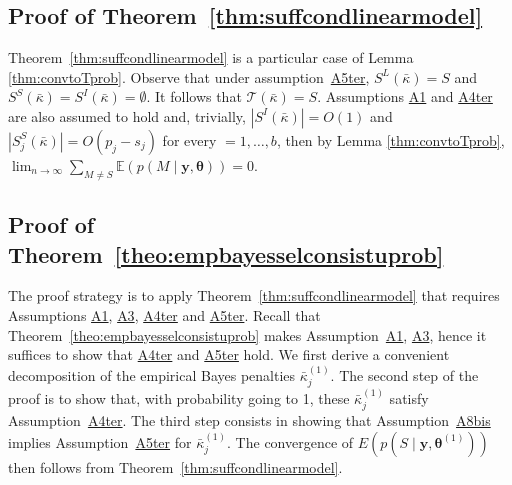 \documentclass[
  12pt]{article}
\newcommand{\E}{\mathbb{E}}
\newcommand{\T}{\mathcal{T}}
\newcommand{\by}{\mathbf{y}}
\newcommand{\btheta}{\boldsymbol{\theta}}
\begin{document}
\subsection{Proof of Theorem~\ref{thm:suffcondlinearmodel}}
Theorem~\ref{thm:suffcondlinearmodel} is a particular case of Lemma \ref{thm:convtoTprob}. Observe that under assumption~\hyperlink{lab:A5ter}{A5ter}, $S^L(\bar{\kappa})=S$ and $S^S(\bar{\kappa})=S^I(\bar{\kappa})=\emptyset$. It follows that $\T(\bar{\kappa})=S$. Assumptions \hyperlink{lab:A1}{A1} and \hyperlink{lab:A4ter}{A4ter} are also assumed to hold and, trivially, $|S^{I}(\bar{\kappa})|=O(1)$ and $|S^{S}_j(\bar{\kappa})|=O(p_j-s_j)$ for every $=1,\ldots,b$, then by Lemma \ref{thm:convtoTprob}, $\lim_{n \to \infty} \sum_{M \neq S} \E\left(p(M\mid \by, \btheta)\right)= 0$.


\subsection{Proof of Theorem~\ref{theo:empbayesselconsistuprob}}
The proof strategy is to apply Theorem~\ref{thm:suffcondlinearmodel} that requires Assumptions \hyperlink{lab:A1}{A1}, \hyperlink{lab:A3}{A3}, \hyperlink{lab:A4ter}{A4ter} and \hyperlink{lab:A5ter}{A5ter}. Recall that Theorem~\ref{theo:empbayesselconsistuprob} makes Assumption~\hyperlink{lab:A1}{A1}, \hyperlink{lab:A3}{A3}, hence it suffices to show that \hyperlink{lab:A4ter}{A4ter} and \hyperlink{lab:A5ter}{A5ter} hold.
We first derive a convenient decomposition of the empirical Bayes penalties $\bar{\kappa}^{(1)}_j$. The second step of the proof is to show that, with probability going to 1, these $\bar{\kappa}^{(1)}_j$ satisfy Assumption~\hyperlink{lab:A4ter}{A4ter}. The third step consists in showing that Assumption~\hyperlink{lab:A8bis}{A8bis} implies Assumption~\hyperlink{lab:A5ter}{A5ter} for $\bar{\kappa}^{(1)}_j$. The convergence of $E\left(p(S\mid \by, \btheta^{(1)})\right)$ then follows from Theorem~\ref{thm:suffcondlinearmodel}.
\end{document}
